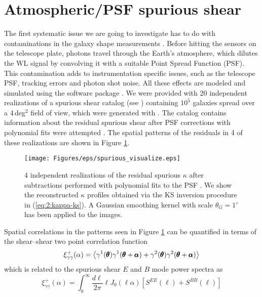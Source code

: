 \section{Atmospheric/PSF spurious shear}
The first systematic issue we are going to investigate has to do with contaminations in the galaxy shape measurements \citep{PetriSpShear}. Before hitting the sensors on the telescope plate, photons travel through the Earth's atmosphere, which dilutes the WL signal by convolving it with a suitable Point Spread Function (PSF). This contamination adds to instrumentation specific issues, such as the telescope PSF, tracking errors and photon shot noise. All these effects are modeled and simulated using the  software package \citep{LSSTOperations}. We were provided with 20 independent realizations of a spurious shear catalog (see \citep{ChangLSST}) containing $10^5$ galaxies spread over a 4\,deg$^2$ field of view, which were generated with . The catalog contains information about the residual spurious shear after PSF corrections with polynomial fits were attempted \citep{ChangLSST}. The spatial patterns of the residuals in 4 of these realizations are shown in Figure \ref{fig:7:spvisualize}. 
%
\begin{figure}
\begin{center}
\texttt{[image: Figures/eps/spurious\_visualize.eps]}
\end{center}
\caption{4 independent realizations of the residual spurious $\kappa$ after subtractions performed with polynomial fits to the PSF \citep{ChangLSST}. We show the reconstructed $\kappa$ profiles obtained via the KS inversion procedure in (\ref{eq:2:kappa-ks}). A Gaussian smoothing kernel with scale $\theta_G=1'$ has been applied to the images.}
\label{fig:7:spvisualize}
\end{figure}
%
Spatial correlations in the patterns seen in Figure \ref{fig:7:spvisualize} can be quantified in terms of the shear--shear two point correlation function
\begin{equation}
\label{eq:7:shear2pt}
\xi_{\gamma\gamma}^+(\alpha) = \left\langle\gamma^1(\pmb{\theta})\gamma^1(\pmb{\theta}+\pmb{\alpha})+\gamma^2(\pmb{\theta})\gamma^2(\pmb{\theta}+\pmb{\alpha})\right\rangle
\end{equation} 
%
which is related to the spurious shear $E$ and $B$ mode power spectra as 
\begin{equation}
\label{eq:7:shearPow}
\xi_{\gamma\gamma}^+(\alpha) = \int_0^\infty \frac{d\ell}{2\pi}\ell J_0(\ell\alpha)[S^{EE}(\ell)+S^{BB}(\ell)] 
\end{equation}
